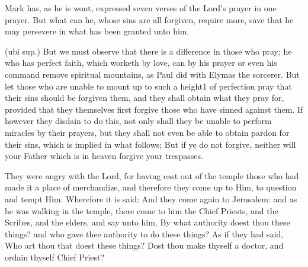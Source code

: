  Mark has, as he is wont, expressed seven verses of the Lord’s prayer in one prayer. But what can he, whose sins are all forgiven, require more, save that he may persevere in what has been granted unto him.

 (ubi sup.) But we must observe that there is a difference in those who pray; he who has perfect faith, which worketh by love, can by his prayer or even his command remove spiritual mountains, as Paul did with Elymas the sorcerer. But let those who are unable to mount up to such a height1 of perfection pray that their sins should be forgiven them, and they shall obtain what they pray for, provided that they themselves first forgive those who have sinned against them. If however they disdain to do this, not only shall they be unable to perform miracles by their prayers, but they shall not even be able to obtain pardon for their sins, which is implied in what follows; But if ye do not forgive, neither will your Father which is in heaven forgive your trespasses.

 

 They were angry with the Lord, for having cast out of the temple those who had made it a place of merchandize, and therefore they come up to Him, to question and tempt Him. Wherefore it is said: And they come again to Jerusalem: and as he was walking in the temple, there come to him the Chief Priests, and the Scribes, and the elders, and say unto him, By what authority doest thou these things? and who gave thee authority to do these things? As if they had said, Who art thou that doest these things? Dost thou make thyself a doctor, and ordain thyself Chief Priest?

